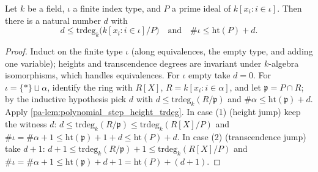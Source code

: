 \begin{theorem}
  \label{pa-thm:trdeg_height_polynomial}
  \leanok

  Let \(k\) be a field, \(\iota\) a finite index type, and \(P\) a prime ideal of
  \(k[x_i : i \in \iota]\). Then there is a natural number \(d\) with
  \[
    d \leq \mathrm{trdeg}_k\bigl(k[x_i : i \in \iota]/P\bigr)
    \quad\text{and}\quad
    \#\iota \leq \mathrm{ht}(P) + d.
  \]
\end{theorem}
\begin{proof}
  \leanok
  Induct on the finite type \(\iota\) (along equivalences, the empty type, and adding
  one variable); heights and transcendence degrees are invariant under \(k\)-algebra
  isomorphisms, which handles equivalences. For \(\iota\) empty take \(d = 0\). For
  \(\iota = \{*\} \sqcup \alpha\), identify the ring with \(R[X]\),
  \(R = k[x_i : i \in \alpha]\), and let \(\mathfrak p = P \cap R\); by the inductive
  hypothesis pick \(d\) with \(d \leq \mathrm{trdeg}_k(R/\mathfrak p)\) and
  \(\#\alpha \leq \mathrm{ht}(\mathfrak p) + d\). Apply
  \ref{pa-lem:polynomial_step_height_trdeg}. In case (1) (height jump) keep the witness
  \(d\):
  \(d \leq \mathrm{trdeg}_k(R/\mathfrak p) \leq \mathrm{trdeg}_k(R[X]/P)\) and
  \(\#\iota = \#\alpha + 1 \leq \mathrm{ht}(\mathfrak p) + 1 + d \leq
  \mathrm{ht}(P) + d\). In case (2) (transcendence jump) take \(d + 1\):
  \(d + 1 \leq \mathrm{trdeg}_k(R/\mathfrak p) + 1 \leq \mathrm{trdeg}_k(R[X]/P)\) and
  \(\#\iota = \#\alpha + 1 \leq \mathrm{ht}(\mathfrak p) + d + 1 = \mathrm{ht}(P) +
  (d + 1)\).
\end{proof}

